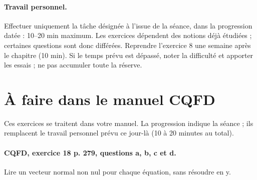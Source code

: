 \paragraph{Travail personnel.} Effectuer uniquement la tâche désignée à l’issue de la séance, dans la progression datée : 10–20 min maximum. Les exercices dépendent des notions déjà étudiées ; certaines questions sont donc différées. Reprendre l’exercice 8 une semaine après le chapitre (10 min). Si le temps prévu est dépassé, noter la difficulté et apporter les essais ; ne pas accumuler toute la réserve.
\endgroup
{}\section*{À faire dans le manuel CQFD}
Ces exercices se traitent dans votre manuel. La progression indique la séance ; ils remplacent le travail personnel prévu ce jour-là (10 à 20 minutes au total).
\paragraph{CQFD, exercice 18 p. 279, questions a, b, c et d.}\label{C07-M1} Lire un vecteur normal non nul pour chaque équation, sans résoudre en y.
